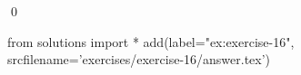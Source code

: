 
\begin{ex} 
  \label{ex:exercise-16}
  
  \qed
\end{ex} 
\begin{python0}
from solutions import *
add(label="ex:exercise-16",
    srcfilename='exercises/exercise-16/answer.tex') 
\end{python0}
